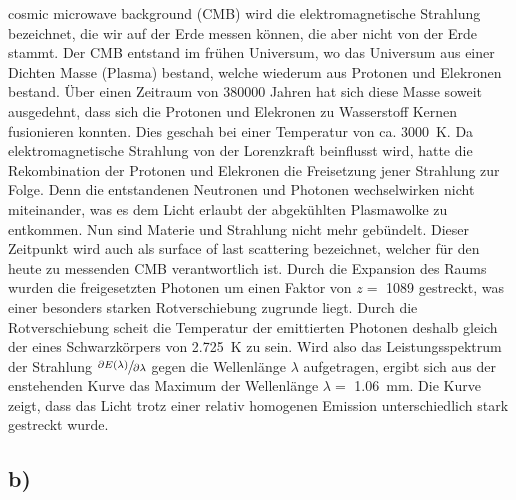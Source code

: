     \justifying cosmic microwave background (CMB) wird die elektromagnetische Strahlung bezeichnet, die wir auf der Erde messen können, die aber nicht von der Erde stammt. 
    Der CMB entstand im frühen Universum, wo das Universum aus einer Dichten Masse (Plasma) bestand, welche wiederum aus Protonen und Elekronen bestand. Über einen Zeitraum von 380000 Jahren
    hat sich diese Masse soweit ausgedehnt, dass sich die Protonen und Elekronen zu Wasserstoff Kernen fusionieren konnten. Dies geschah bei einer Temperatur von ca. 
    \SI{3000}{\kelvin}. Da elektromagnetische Strahlung von der Lorenzkraft beinflusst wird, hatte die Rekombination der Protonen und Elekronen die Freisetzung jener Strahlung zur Folge.
    Denn die entstandenen Neutronen und Photonen wechselwirken nicht miteinander, was es dem Licht erlaubt der abgekühlten Plasmawolke zu entkommen. Nun sind Materie und Strahlung nicht
    mehr gebündelt. Dieser Zeitpunkt wird auch als surface of last scattering bezeichnet, welcher für den heute zu messenden CMB verantwortlich ist. Durch die Expansion des Raums 
    wurden die freigesetzten Photonen um einen Faktor von $z=$ 1089 gestreckt, was einer besonders starken Rotverschiebung zugrunde liegt. Durch die Rotverschiebung scheit die Temperatur der emittierten Photonen
    deshalb gleich der eines Schwarzkörpers von \SI{2.725}{\kelvin} zu sein. Wird also das Leistungsspektrum der Strahlung $\sfrac{\partial E(\lambda)}{\partial \lambda}$ gegen die Wellenlänge
    $\lambda$ aufgetragen, ergibt sich aus der enstehenden Kurve das Maximum der Wellenlänge $\lambda=$ \SI{1.06}{\milli\meter}. Die Kurve zeigt, dass das Licht trotz einer relativ homogenen
    Emission unterschiedlich stark gestreckt wurde. 

\subsection{b)}

